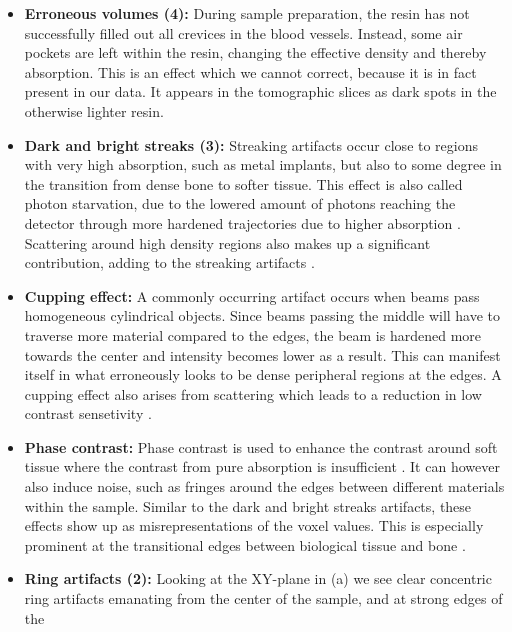 \begin{itemize}
	\item \textbf{Erroneous volumes (4):} During sample preparation, the
		resin has not successfully filled out all crevices in the blood
		vessels. Instead, some air pockets are left within the resin,
		changing the effective density and thereby absorption. This is
		an effect which we cannot correct, because it is in fact
		present in our data. It appears in the tomographic slices
		 as dark spots in the otherwise lighter resin. 
	\item \textbf{Dark and bright streaks (3):} Streaking artifacts occur close to
	  regions with very high absorption, such as metal implants, but also
		to some degree in the transition from dense bone to softer
		tissue.  This effect is also called photon starvation, due to
		the lowered amount of photons reaching the detector through
		more hardened trajectories due to higher absorption
		\citep{srnoise}. Scattering around high density regions also
		makes up a significant contribution, adding to the streaking
		artifacts \citep{scatter_sr_ct}.
  \item \textbf{Cupping effect:} A commonly occurring artifact occurs when
	  beams pass homogeneous cylindrical objects. Since beams passing the
		middle will have to traverse more material compared to the
		edges, the beam is hardened more towards the center and
		intensity becomes lower as a result. This can manifest itself
		in what erroneously looks to be dense peripheral regions at the
		edges. A cupping effect also arises from scattering which leads
		to a reduction in low contrast sensetivity
		\citep{sr_streak_artifacts_scatter}.
  \item \textbf{Phase contrast:} Phase contrast is used to enhance the contrast
	  around soft tissue where the contrast from pure absorption is
		insufficient \citep{phasecontrast}. It can however also induce
		noise, such as fringes around the edges between different
		materials within the sample\citep{srnoise}. Similar to the dark
		and bright streaks artifacts, these effects show up as
		misrepresentations of the voxel values. This is especially
		prominent at the transitional edges between biological tissue
		and bone \citep{sr_streak_artifacts_scatter}.
	\item \textbf{Ring artifacts (2):} Looking at the XY-plane in
	  (a) we see clear concentric ring artifacts emanating
		from the center of the sample, and at strong edges of the

\end{itemize}

